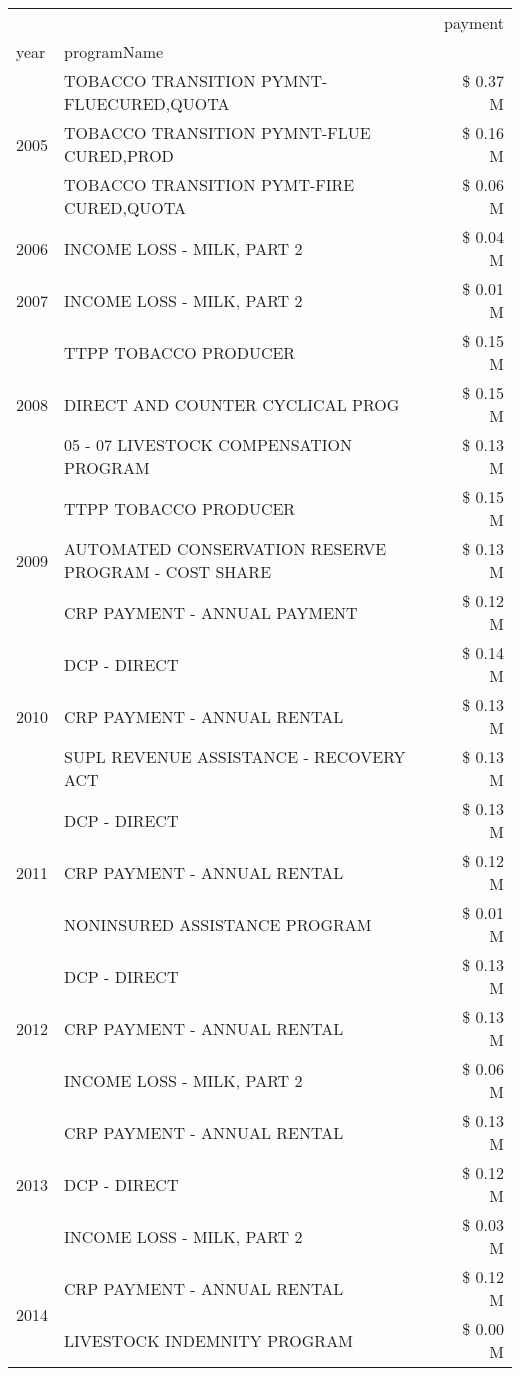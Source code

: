 \begin{tabular}{llr}
\toprule
 &  & payment \\
year & programName &  \\
\midrule
\multirow[t]{3}{*}{2005} & TOBACCO TRANSITION PYMNT-FLUECURED,QUOTA & \$ 0.37 M \\
 & TOBACCO TRANSITION PYMNT-FLUE CURED,PROD & \$ 0.16 M \\
 & TOBACCO TRANSITION PYMT-FIRE CURED,QUOTA & \$ 0.06 M \\
\cline{1-3}
2006 & INCOME LOSS - MILK, PART 2 & \$ 0.04 M \\
\cline{1-3}
2007 & INCOME LOSS - MILK, PART 2 & \$ 0.01 M \\
\cline{1-3}
\multirow[t]{3}{*}{2008} & TTPP TOBACCO PRODUCER & \$ 0.15 M \\
 & DIRECT AND COUNTER CYCLICAL PROG & \$ 0.15 M \\
 & 05 - 07 LIVESTOCK COMPENSATION PROGRAM & \$ 0.13 M \\
\cline{1-3}
\multirow[t]{3}{*}{2009} & TTPP TOBACCO PRODUCER & \$ 0.15 M \\
 & AUTOMATED CONSERVATION RESERVE PROGRAM - COST SHARE & \$ 0.13 M \\
 & CRP PAYMENT - ANNUAL PAYMENT & \$ 0.12 M \\
\cline{1-3}
\multirow[t]{3}{*}{2010} & DCP - DIRECT & \$ 0.14 M \\
 & CRP PAYMENT - ANNUAL RENTAL & \$ 0.13 M \\
 & SUPL REVENUE ASSISTANCE - RECOVERY ACT & \$ 0.13 M \\
\cline{1-3}
\multirow[t]{3}{*}{2011} & DCP - DIRECT & \$ 0.13 M \\
 & CRP PAYMENT - ANNUAL RENTAL & \$ 0.12 M \\
 & NONINSURED ASSISTANCE PROGRAM & \$ 0.01 M \\
\cline{1-3}
\multirow[t]{3}{*}{2012} & DCP - DIRECT & \$ 0.13 M \\
 & CRP PAYMENT - ANNUAL RENTAL & \$ 0.13 M \\
 & INCOME LOSS - MILK, PART 2 & \$ 0.06 M \\
\cline{1-3}
\multirow[t]{3}{*}{2013} & CRP PAYMENT - ANNUAL RENTAL & \$ 0.13 M \\
 & DCP - DIRECT & \$ 0.12 M \\
 & INCOME LOSS - MILK, PART 2 & \$ 0.03 M \\
\cline{1-3}
\multirow[t]{3}{*}{2014} & CRP PAYMENT - ANNUAL RENTAL & \$ 0.12 M \\
 & LIVESTOCK INDEMNITY PROGRAM & \$ 0.00 M \\

\end{tabular}

